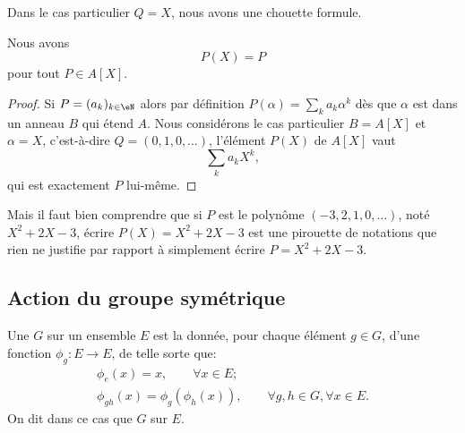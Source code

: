Dans le cas particulier \( Q=X\), nous avons une chouette formule.
\begin{lemma}       \label{LEMooGKWQooVOyeDX}
    Nous avons
    \begin{equation}
        P(X)=P
    \end{equation}
    pour tout \( P\in A[X]\).
\end{lemma}

\begin{proof}
    Si \( P=(a_k)_{k\in \eN}\) alors par définition \( P(\alpha)=\sum_ka_k\alpha^k\) dès que \( \alpha\) est dans un anneau \( B\) qui étend \( A\). Nous considérons le cas particulier \( B=A[X]\) et \( \alpha=X\), c'est-à-dire \( Q=(0,1,0,\ldots)\), l'élément \( P(X)\) de \( A[X]\) vaut
    \begin{equation}        \label{EQooABULooFCEasf}
        \sum_ka_kX^k,
    \end{equation}
    qui est exactement \( P\) lui-même.
\end{proof}

Mais il faut bien comprendre que si \( P\) est le polynôme \( (-3,2,1,0,\ldots)\), noté \( X^2+2X-3\), écrire \( P(X)=X^2+2X-3\) est une pirouette de notations que rien ne justifie par rapport à simplement écrire \( P=X^2+2X-3\).



\subsection{Action du groupe symétrique}

\begin{definition}  \label{DefActionGroupe}
    Une  \( G\) sur un ensemble \( E\) est la donnée, pour chaque élément \( g \in G\), d'une fonction \(\phi_g : E \to E \), de telle sorte que:
    \begin{gather*}
        \phi_{e}(x) = x, \hspace{2em} \forall x \in E;\\
        \phi_{gh}(x) = \phi_g (\phi_h (x)),  \hspace{2em} \forall g,h \in G, \forall x \in E.
     \end{gather*}
     On dit dans ce cas que \( G \)  sur \( E \).
\end{definition}

